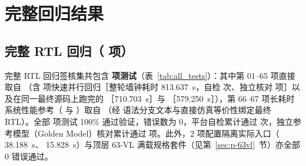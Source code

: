 \chapter{完整回归结果}\label{app:regress}\label{app:all-tests}

\section{完整 RTL 回归（\RegCount{} 项）}
完整 RTL 回归签核集共包含 \textbf{\RegCount{} 项测试}（表~\ref{tab:all_tests}）：其中第 01--65 项直接取自 （含 \RegFastCount{} 项快速并行回归［整轮墙钟耗时 813.637~s，自检 \countsep{\RegFastChecks} 次、独立核对 \countsep{\RegFastIndep} 项］以及在同一最终源码上跑完的 ［710.703~s］与 ［579.250~s］），第 66--67 项长耗时系统性能参考（ 与 ）取自 （经  语法分支文本与直接仿真等价性绑定最终 RTL）。全部 \RegCount{} 项测试 100\% 通过验证，错误数为 0，平台自检累计通过 \countsep{\RegChecks} 次，独立参考模型（Golden Model）核对累计通过 \countsep{\RegIndep} 项。此外，2 项配置隔离实际入口（ 38.188~s、 15.828~s）与顶层 63-VL 满载规格套件（见第~\ref{sec:p-63vl}~节）亦全部 0 错误通过。

